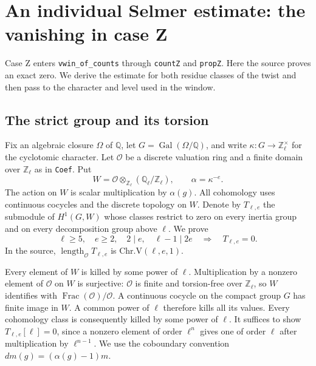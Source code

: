 \section{An individual Selmer estimate: the vanishing in case Z}
\label{sec:case-z}

Case Z enters \texttt{vwin\_\allowbreak{}of\_\allowbreak{}counts} through \texttt{count\allowbreak{}Z} and
\texttt{prop\allowbreak{}Z}. Here the source proves an exact zero. We derive the
estimate for both residue classes of the twist and then pass to the
character and level used in the window.

\subsection{The strict group and its torsion}

Fix an algebraic closure \(\Omega\) of \(\mathbb Q\), let
\(G=\operatorname{Gal}(\Omega/\mathbb Q)\), and write
\(\kappa:G\to\mathbb Z_\ell^\times\) for the cyclotomic character.
Let \(\mathcal O\) be a discrete valuation ring and a finite domain
over \(\mathbb Z_\ell\) as in \texttt{Coef}. Put
\[
  W=\mathcal O\otimes_{\mathbb Z_\ell}(\mathbb Q_\ell/\mathbb Z_\ell),
     \qquad \alpha=\kappa^{-e}.
\]
The action on \(W\) is scalar multiplication by \(\alpha(g)\).
All cohomology uses continuous cocycles and the discrete topology on
\(W\). Denote by \(T_{\ell,e}\) the submodule of \(H^1(G,W)\)
whose classes restrict to zero on every inertia group and on every
decomposition group above \(\ell\). We prove
\begin{equation}
 \ell\ge5,\quad e\ge2,\quad 2\mid e,\quad \ell-1\mid 2e
           \quad\Longrightarrow\quad T_{\ell,e}=0 .
 \label{eq:rh-z-vanish}
\end{equation}
In the source, \(\operatorname{length}_{\mathcal O}T_{\ell,e}\) is
\(\mathrm{Chr.V}(\ell,e,1)\).

Every element of \(W\) is killed by some power of \(\ell\).
Multiplication by a nonzero element of \(\mathcal O\) on \(W\) is
surjective: \(\mathcal O\) is finite and torsion-free over
\(\mathbb Z_\ell\), so \(W\) identifies with
\(\operatorname{Frac}(\mathcal O)/\mathcal O\).
A continuous cocycle on the compact group \(G\) has finite image in
\(W\). A common power of \(\ell\) therefore kills all its values.
Every cohomology class is consequently killed by some power of \(\ell\).
It suffices to show \(T_{\ell,e}[\ell]=0\), since a nonzero element
of order \(\ell^n\) gives one of order \(\ell\) after multiplication by
\(\ell^{n-1}\). We use the coboundary convention
\(d m(g)=(\alpha(g)-1)m\).

